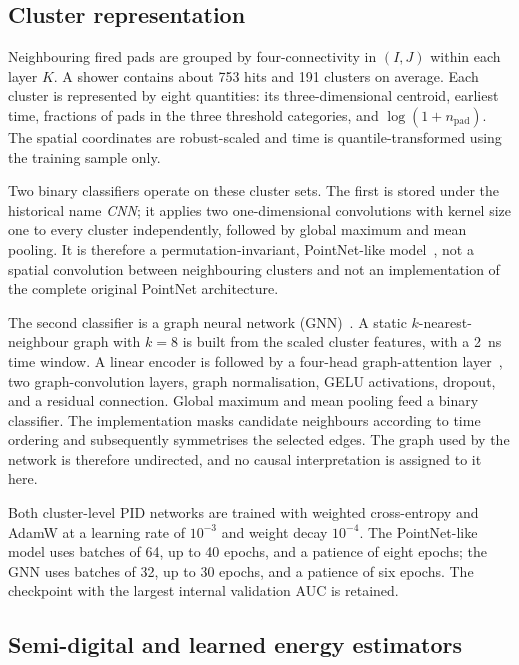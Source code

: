 \documentclass[11pt,a4paper]{article}
\begin{document}
\subsection{Cluster representation}
\label{sec:clusters}

Neighbouring fired pads are grouped by four-connectivity in $(I,J)$ within each layer
$K$. A shower contains about 753 hits and 191 clusters on average. Each cluster is
represented by eight quantities: its three-dimensional centroid, earliest time,
fractions of pads in the three threshold categories, and $\log(1+n_{\mathrm{pad}})$.
The spatial coordinates are robust-scaled and time is quantile-transformed using the
training sample only.

Two binary classifiers operate on these cluster sets. The first is stored under the
historical name \emph{CNN}; it applies two one-dimensional convolutions with kernel
size one to every cluster independently, followed by global maximum and mean pooling.
It is therefore a permutation-invariant, PointNet-like model~\cite{pointnet2017}, not
a spatial convolution between neighbouring clusters and not an implementation of the
complete original PointNet architecture.

The second classifier is a graph neural network (GNN)~\cite{shlomi2021}. A static
$k$-nearest-neighbour graph with $k=8$ is built from the scaled cluster features, with
a \SI{2}{ns} time window. A linear encoder is followed by a four-head graph-attention
layer~\cite{gat2018}, two graph-convolution layers, graph normalisation, GELU
activations, dropout, and a residual connection. Global maximum and mean pooling feed
a binary classifier. The implementation masks candidate neighbours according to time
ordering and subsequently symmetrises the selected edges. The graph used by the
network is therefore undirected, and no causal interpretation is assigned to it here.

Both cluster-level PID networks are trained with weighted cross-entropy and AdamW at
a learning rate of $10^{-3}$ and weight decay $10^{-4}$. The PointNet-like model uses
batches of 64, up to 40 epochs, and a patience of eight epochs; the GNN uses batches
of 32, up to 30 epochs, and a patience of six epochs. The checkpoint with the largest
internal validation AUC is retained.

\subsection{Semi-digital and learned energy estimators}
\label{sec:energy-methods}
\end{document}
